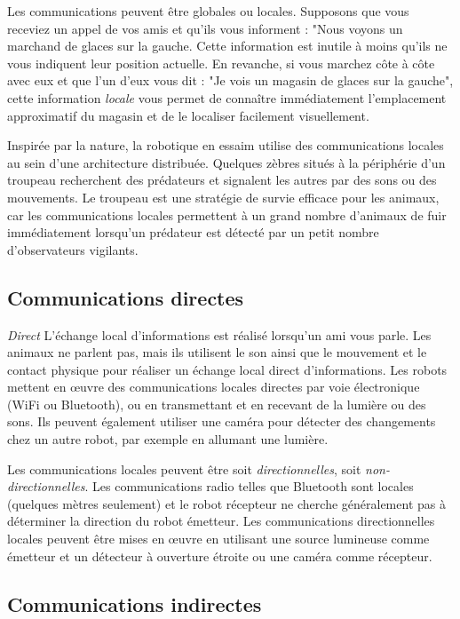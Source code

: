 Les communications peuvent être globales ou locales. Supposons que vous receviez un appel de vos amis et qu'ils vous informent : "Nous voyons un marchand de glaces sur la gauche. Cette information est inutile à moins qu'ils ne vous indiquent leur position actuelle. En revanche, si vous marchez côte à côte avec eux et que l'un d'eux vous dit : "Je vois un magasin de glaces sur la gauche", cette information \emph{locale} vous permet de connaître immédiatement l'emplacement approximatif du magasin et de le localiser facilement visuellement.

Inspirée par la nature, la robotique en essaim utilise des communications locales au sein d'une architecture distribuée. Quelques zèbres situés à la périphérie d'un troupeau recherchent des prédateurs et signalent les autres par des sons ou des mouvements. Le troupeau est une stratégie de survie efficace pour les animaux, car les communications locales permettent à un grand nombre d'animaux de fuir immédiatement lorsqu'un prédateur est détecté par un petit nombre d'observateurs vigilants.

\subsection{Communications directes}

\emph{Direct} L'échange local d'informations est réalisé lorsqu'un ami vous parle. Les animaux ne parlent pas, mais ils utilisent le son ainsi que le mouvement et le contact physique pour réaliser un échange local direct d'informations. Les robots mettent en œuvre des communications locales directes par voie électronique (WiFi ou Bluetooth), ou en transmettant et en recevant de la lumière ou des sons. Ils peuvent également utiliser une caméra pour détecter des changements chez un autre robot, par exemple en allumant une lumière. 

Les communications locales peuvent être soit \emph{directionnelles}, soit \emph{non-directionnelles}. Les communications radio telles que Bluetooth sont locales (quelques mètres seulement) et le robot récepteur ne cherche généralement pas à déterminer la direction du robot émetteur. Les communications directionnelles locales peuvent être mises en œuvre en utilisant une source lumineuse comme émetteur et un détecteur à ouverture étroite ou une caméra comme récepteur.

\subsection{Communications indirectes}

